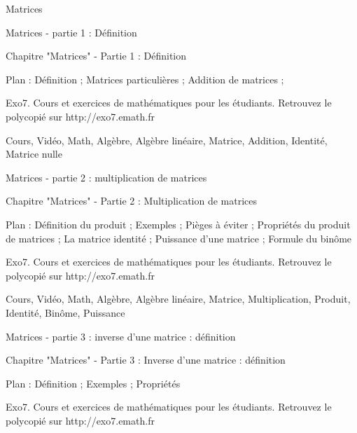 
   Matrices




Matrices - partie 1 : Définition



Chapitre "Matrices" - Partie 1 : Définition

Plan : Définition ; Matrices particulières ; 
Addition de matrices ; 

Exo7. Cours et exercices de mathématiques pour les étudiants.
Retrouvez le polycopié sur http://exo7.emath.fr


Cours, Vidéo, Math, Algèbre, Algèbre linéaire, Matrice, Addition, Identité, Matrice nulle



Matrices - partie 2 : multiplication de matrices



Chapitre "Matrices" - Partie 2 : Multiplication de matrices

Plan : Définition du produit ; Exemples ; Pièges à éviter ;
Propriétés du produit de matrices ; La matrice identité ; 
Puissance d'une matrice ; Formule du binôme

Exo7. Cours et exercices de mathématiques pour les étudiants.
Retrouvez le polycopié sur http://exo7.emath.fr


Cours, Vidéo, Math, Algèbre, Algèbre linéaire, Matrice,
Multiplication, Produit, Identité, Binôme, Puissance




Matrices - partie 3 : inverse d'une matrice : définition



Chapitre "Matrices" - Partie 3 : Inverse d'une matrice : définition

Plan : Définition ; Exemples ; Propriétés

Exo7. Cours et exercices de mathématiques pour les étudiants.
Retrouvez le polycopié sur http://exo7.emath.fr


